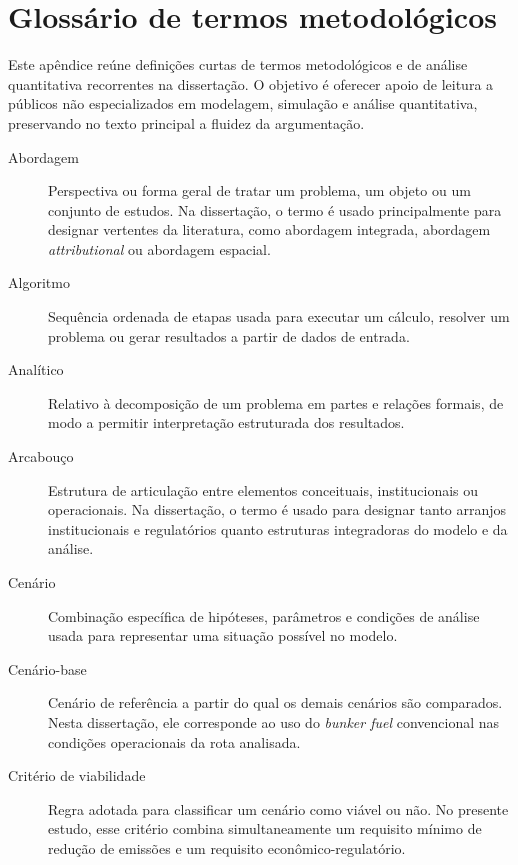 \chapter{Glossário de termos metodológicos}
\label{ap:glossario_metodologico}

Este apêndice reúne definições curtas de termos metodológicos e de análise quantitativa recorrentes na dissertação. O objetivo é oferecer apoio de leitura a públicos não especializados em modelagem, simulação e análise quantitativa, preservando no texto principal a fluidez da argumentação.

\begin{description}
    \item[Abordagem] Perspectiva ou forma geral de tratar um problema, um objeto ou um conjunto de estudos. Na dissertação, o termo é usado principalmente para designar vertentes da literatura, como abordagem integrada, abordagem \emph{attributional} ou abordagem espacial.

    \item[Algoritmo] Sequência ordenada de etapas usada para executar um cálculo, resolver um problema ou gerar resultados a partir de dados de entrada.

    \item[Analítico] Relativo à decomposição de um problema em partes e relações formais, de modo a permitir interpretação estruturada dos resultados.

    \item[Arcabouço] Estrutura de articulação entre elementos conceituais, institucionais ou operacionais. Na dissertação, o termo é usado para designar tanto arranjos institucionais e regulatórios quanto estruturas integradoras do modelo e da análise.

    \item[Cenário] Combinação específica de hipóteses, parâmetros e condições de análise usada para representar uma situação possível no modelo.

    \item[Cenário-base] Cenário de referência a partir do qual os demais cenários são comparados. Nesta dissertação, ele corresponde ao uso do \emph{bunker fuel} convencional nas condições operacionais da rota analisada.

    \item[Critério de viabilidade] Regra adotada para classificar um cenário como viável ou não. No presente estudo, esse critério combina simultaneamente um requisito mínimo de redução de emissões e um requisito econômico-regulatório.


\end{description}
